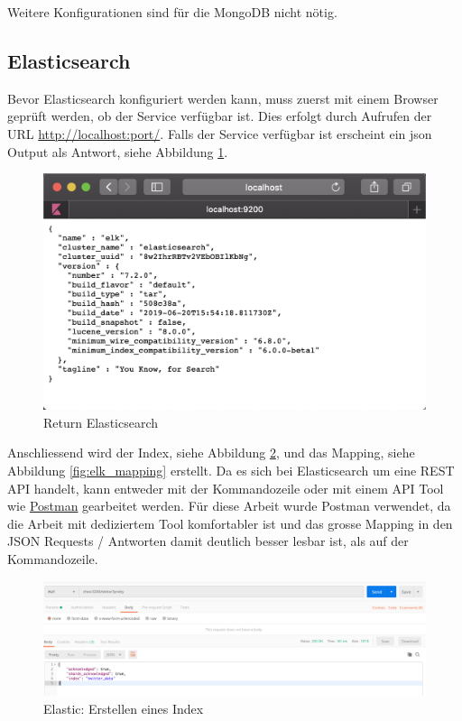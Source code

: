 Weitere Konfigurationen sind f{\"u}r die MongoDB nicht n{\"o}tig.

\clearpage

\subsection{Elasticsearch}
Bevor Elasticsearch konfiguriert werden kann, muss zuerst mit einem Browser gepr{\"u}ft werden, ob der Service verf{\"u}gbar ist. Dies erfolgt durch Aufrufen der URL \url{http://localhost:port/}. Falls der Service verf{\"u}gbar ist erscheint ein json Output als Antwort, siehe Abbildung \ref{fig:return_elk}.

\begin{figure}[H]
	\centering
		\includegraphics[scale=0.4 ]{images/elastic_return.png}
	\caption{Return Elasticsearch}
	\label{fig:return_elk}
\end{figure}

Anschliessend wird der Index, siehe Abbildung \ref{fig:elk_index}, und das Mapping, siehe Abbildung \ref{fig:elk_mapping} erstellt. Da es sich bei Elasticsearch um eine REST API handelt, kann entweder mit der  Kommandozeile oder mit einem API Tool wie \href{https://www.getpostman.com}{Postman} gearbeitet werden. F{\"u}r diese Arbeit wurde Postman verwendet, da die Arbeit mit dediziertem Tool komfortabler ist und das grosse Mapping in den JSON Requests / Antworten damit deutlich besser lesbar ist, als auf der Kommandozeile.

\begin{figure}[H]
	\centering
		\includegraphics[scale=0.2]{images/elastic_create_index.png}
	\caption{Elastic: Erstellen eines Index}
	\label{fig:elk_index}
\end{figure}


